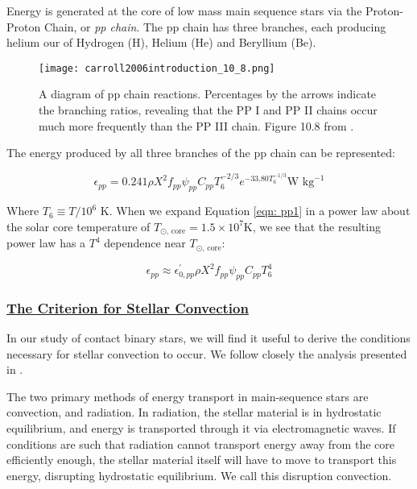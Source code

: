 \documentclass[12pt]{article} %
\numberwithin{equation}{section} %
\begin{document}
Energy is generated at the core of low mass main sequence stars via the Proton-Proton Chain, or \emph{pp chain}. The pp chain has three branches, each producing helium our of Hydrogen (H), Helium (He) and Beryllium (Be). 

\begin{figure}[H]
\centering
\texttt{[image: carroll2006introduction\_10\_8.png]}
\caption{A diagram of pp chain reactions. Percentages by the arrows indicate the branching ratios, revealing that the PP I and PP II chains occur much more frequently than the PP III chain. Figure 10.8 from \citet{carroll2006introduction}.}
\label{fig: carroll2006introduction_10_8}
\end{figure}

The energy produced by all three branches of the pp chain can be represented:

\begin{equation} \label{eqn: pp1}
\epsilon_{pp} = 0.241 \rho X^{2} f_{pp} \psi_{pp} C_{pp} T_{6}^{-2/3} e^{-33.80 T_{6}^{-1/3}} \text{W } \text{kg}^{-1}
\end{equation}

Where $T_{6} \equiv T / 10^{6}$ K. When we expand Equation \ref{eqn: pp1} in a power law about the solar core temperature of $T_{\odot \text{, core}} = 1.5 \times 10^{7}$K, we see that the resulting power law has a $T^{4}$ dependence near $T_{\odot \text{, core}}$:

\begin{equation} \label{eqn: pp2}
\epsilon_{pp} \approx \epsilon_{0, pp}^{'} \rho X^{2} f_{pp} \psi_{pp} C_{pp} T_{6}^{4}
\end{equation}

\subsubsection[The Criterion for Stellar Convection]{\hyperlink{toc}{The Criterion for Stellar Convection}} \label{sec: The Criterion for Stellar Convection}

In our study of contact binary stars, we will find it useful to derive the conditions necessary for stellar convection to occur. We follow closely the analysis presented in \citet{carroll2006introduction}.

The two primary methods of energy transport in main-sequence stars are convection, and radiation. In radiation, the stellar material is in hydrostatic equilibrium, and energy is transported through it via electromagnetic waves. If conditions are such that radiation cannot transport energy away from the core efficiently enough, the stellar material itself will have to move to transport this energy, disrupting hydrostatic equilibrium. We call this disruption convection. 
\end{document}
